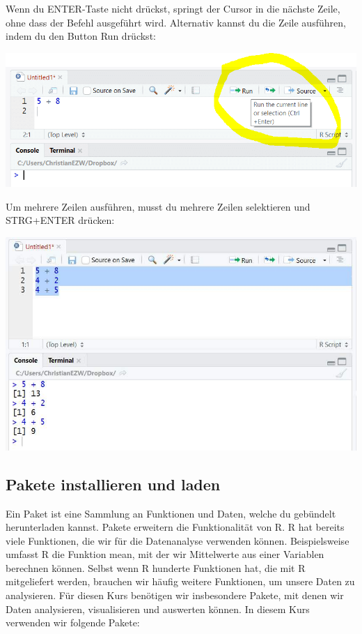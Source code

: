 \documentclass[
]{book}
\begin{document}
Wenn du ENTER-Taste nicht drückst, springt der Cursor in die nächste Zeile, ohne dass der Befehl ausgeführt wird. Alternativ kannst du die Zeile ausführen, indem du den Button Run drückst:

\includegraphics{images/02_grundlagen/run.png}

Um mehrere Zeilen ausführen, musst du mehrere Zeilen selektieren und STRG+ENTER drücken:

\includegraphics{images/02_grundlagen/multi_run.jpg}

\hypertarget{pakete-installieren-und-laden}{%
\subsection{Pakete installieren und laden}\label{pakete-installieren-und-laden}}

Ein Paket ist eine Sammlung an Funktionen und Daten, welche du gebündelt herunterladen kannst. Pakete erweitern die Funktionalität von R. R hat bereits viele Funktionen, die wir für die Datenanalyse verwenden können. Beispielsweise umfasst R die Funktion mean, mit der wir Mittelwerte aus einer Variablen berechnen können. Selbst wenn R hunderte Funktionen hat, die mit R mitgeliefert werden, brauchen wir häufig weitere Funktionen, um unsere Daten zu analysieren. Für diesen Kurs benötigen wir insbesondere Pakete, mit denen wir Daten analysieren, visualisieren und auswerten können. In diesem Kurs verwenden wir folgende Pakete:
\end{document}

